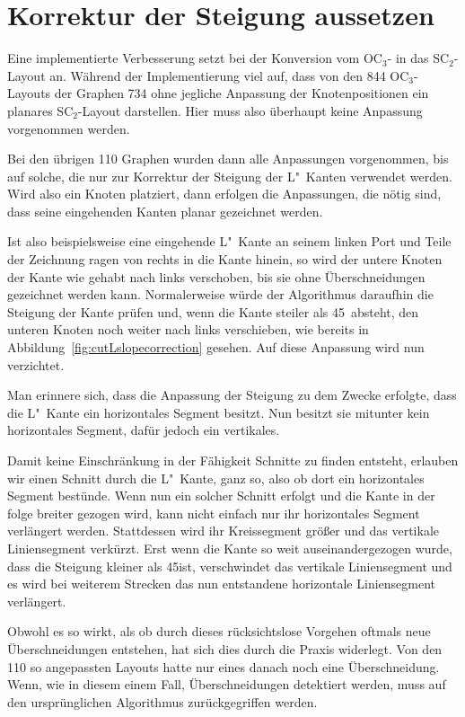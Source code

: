 \documentclass[a4paper]{scrreprt}
\theoremstyle{definition}
\begin{document}

\section{Korrektur der Steigung aussetzen}

Eine implementierte Verbesserung setzt bei der Konversion vom OC$_3$- in das SC$_2$-Layout an. Während der Implementierung viel auf, dass von den 844 OC$_3$-Layouts der Graphen 734 ohne jegliche Anpassung der Knotenpositionen ein planares SC$_2$-Layout darstellen. Hier muss also überhaupt keine Anpassung vorgenommen werden.

Bei den übrigen 110 Graphen wurden dann alle Anpassungen vorgenommen, bis auf solche, die nur zur Korrektur der Steigung der L"~Kanten verwendet werden. Wird also ein Knoten platziert, dann erfolgen die Anpassungen, die nötig sind, dass seine eingehenden Kanten planar gezeichnet werden.

Ist also beispielsweise eine eingehende L"~Kante an seinem linken Port und Teile der Zeichnung ragen von rechts in die Kante hinein, so wird der untere Knoten der Kante wie gehabt nach links verschoben, bis sie ohne Überschneidungen gezeichnet werden kann. Normalerweise würde der Algorithmus daraufhin die Steigung der Kante prüfen und, wenn die Kante steiler als 45\textdegree\ absteht, den unteren Knoten noch weiter nach links verschieben, wie bereits in Abbildung~\ref{fig:cutLslopecorrection} gesehen. Auf diese Anpassung wird nun verzichtet. 

Man erinnere sich, dass die Anpassung der Steigung zu dem Zwecke erfolgte, dass die L"~Kante ein horizontales Segment besitzt. Nun besitzt sie mitunter kein horizontales Segment, dafür jedoch ein vertikales.

Damit keine Einschränkung in der Fähigkeit Schnitte zu finden entsteht, erlauben wir einen Schnitt durch die L"~Kante, ganz so, also ob dort ein horizontales Segment bestünde. Wenn nun ein solcher Schnitt erfolgt und die Kante in der folge breiter gezogen wird, kann nicht einfach nur ihr horizontales Segment verlängert werden. Stattdessen wird ihr Kreissegment größer und das vertikale Liniensegment verkürzt. Erst wenn die Kante so weit auseinandergezogen wurde, dass die Steigung kleiner als 45\textdegree ist, verschwindet das vertikale Liniensegment und es wird bei weiterem Strecken das nun entstandene horizontale Liniensegment verlängert.

Obwohl es so wirkt, als ob durch dieses rücksichtslose Vorgehen oftmals neue Überschneidungen entstehen, hat sich dies durch die Praxis widerlegt. Von den 110 so angepassten Layouts hatte nur eines danach noch eine Überschneidung. Wenn, wie in diesem einem Fall, Überschneidungen detektiert werden, muss auf den ursprünglichen Algorithmus zurückgegriffen werden.
\end{document}
